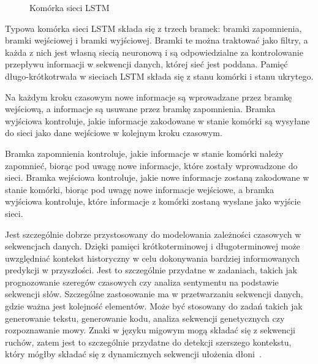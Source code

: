 \begin{figure}[H]
    \caption{Komórka sieci LSTM}
    \label{fig:lstm-cell}
\end{figure}

Typowa komórka sieci LSTM składa się z trzech bramek: bramki zapomnienia, bramki wejściowej i bramki wyjściowej. Bramki te można traktować jako filtry, a każda z nich jest własną siecią neuronową i są odpowiedzialne za kontrolowanie przepływu informacji w sekwencji danych, której sieć jest poddana. Pamięć długo-krótkotrwała w sieciach LSTM składa się z stanu komórki i stanu ukrytego.

Na każdym kroku czasowym nowe informacje są wprowadzane przez bramkę wejściową, a informacje są usuwane przez bramkę zapomnienia. Bramka wyjściowa kontroluje, jakie informacje zakodowane w stanie komórki są wysyłane do sieci jako dane wejściowe w kolejnym kroku czasowym.

Bramka zapomnienia kontroluje, jakie informacje w stanie komórki należy zapomnieć, biorąc pod uwagę nowe informacje, które zostały wprowadzone do sieci. Bramka wejściowa kontroluje, jakie nowe informacje zostaną zakodowane w stanie komórki, biorąc pod uwagę nowe informacje wejściowe, a bramka wyjściowa kontroluje, które informacje z komórki zostaną wysłane jako wyjście sieci.

Jest szczególnie dobrze przystosowany do modelowania zależności czasowych w sekwencjach danych. Dzięki pamięci krótkoterminowej i długoterminowej może uwzględniać kontekst historyczny w celu dokonywania bardziej informowanych predykcji w przyszłości. Jest to szczególnie przydatne w zadaniach, takich jak prognozowanie szeregów czasowych czy analiza sentymentu na podstawie sekwencji słów. Szczególne zastosowanie ma w przetwarzaniu sekwencji danych, gdzie ważna jest kolejność elementów. Może być stosowany do zadań takich jak generowanie tekstu, generowanie kodu, analiza sekwencji genetycznych czy rozpoznawanie mowy. Znaki w języku migowym mogą składać się z sekwencji ruchów, zatem jest to szczególnie przydatne do detekcji szerszego kontekstu, który mógłby składać się z dynamicznych sekwencji ułożenia dłoni~\cite{lee2021}.

